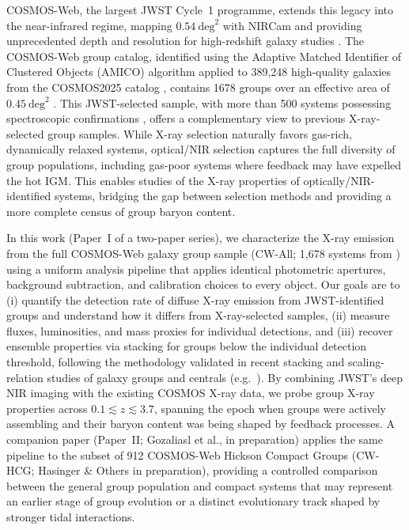 \documentclass{aa}
\begin{document}
COSMOS-Web, the largest JWST Cycle~1 programme, extends this legacy into the near-infrared regime, mapping $0.54~\mathrm{deg}^2$ with NIRCam and providing unprecedented depth and resolution for high-redshift galaxy studies \citep{Casey2023}. The COSMOS-Web group catalog, identified using the Adaptive Matched Identifier of Clustered Objects (AMICO) algorithm applied to 389,248 high-quality galaxies from the COSMOS2025 catalog \citep{Shuntov2025}, contains 1678 groups over an effective area of $0.45~\mathrm{deg}^2$ \citep{Toni2025}. This JWST-selected sample, with more than 500 systems possessing spectroscopic confirmations \citep{Khostovan2025}, offers a complementary view to previous X-ray-selected group samples. While X-ray selection naturally favors gas-rich, dynamically relaxed systems, optical/NIR selection captures the full diversity of group populations, including gas-poor systems where feedback may have expelled the hot IGM. This enables studies of the X-ray properties of optically/NIR-identified systems, bridging the gap between selection methods and providing a more complete census of group baryon content.

In this work (Paper~I of a two-paper series), we characterize the X-ray emission from the full COSMOS-Web galaxy group sample (CW-All; 1,678 systems from \citealt{Toni2025}) using a uniform analysis pipeline that applies identical photometric apertures, background subtraction, and calibration choices to every object. Our goals are to (i) quantify the detection rate of diffuse X-ray emission from JWST-identified groups and understand how it differs from X-ray-selected samples, (ii) measure fluxes, luminosities, and mass proxies for individual detections, and (iii) recover ensemble properties via stacking for groups below the individual detection threshold, following the methodology validated in recent stacking and scaling-relation studies of galaxy groups and centrals (e.g.\ \citealt{Anderson2015,PlanckCollaboration2013,Popesso2025,Robson2023,Marini2024}). By combining JWST's deep NIR imaging with the existing COSMOS X-ray data, we probe group X-ray properties across $0.1 \lesssim z \lesssim 3.7$, spanning the epoch when groups were actively assembling and their baryon content was being shaped by feedback processes. A companion paper (Paper~II; Gozaliasl et al., in preparation) applies the same pipeline to the subset of 912 COSMOS-Web Hickson Compact Groups (CW-HCG; Hasinger \& Others in preparation), providing a controlled comparison between the general group population and compact systems that may represent an earlier stage of group evolution or a distinct evolutionary track shaped by stronger tidal interactions.
\end{document}
